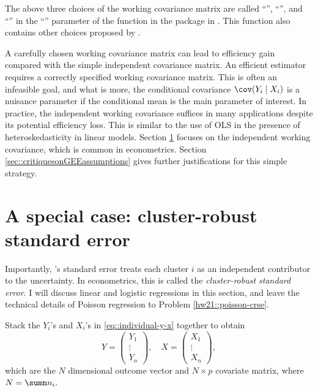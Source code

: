 The above three choices of the working covariance matrix are called
``'', ``'', and ``'' in the ``''
parameter of the function  in the  package in . This function
also contains other choices proposed by \citet{liang1986longitudinal}. 


A carefully chosen working covariance matrix can lead to efficiency gain compared with the simple independent covariance matrix. An efficient estimator requires a correctly specified working covariance matrix. This is often an infeasible goal, and what is more, the conditional covariance $\cov(Y_i\mid X_i)$ is a nuisance parameter if the conditional mean is the main parameter of interest. In practice, the independent working covariance suffices in many applications despite its potential efficiency loss. This is similar to the use of OLS in the presence of heteroskedasticity in linear models. Section \ref{sec::crse-econometrics} focuses on the independent working covariance, which is common in econometrics. Section \ref{sec::critiquesonGEEassumptions} gives further justifications for this simple strategy. 



\section{A special case: cluster-robust standard error} 
\label{sec::crse-econometrics}


Importantly, \citet{liang1986longitudinal}'s standard error treats each cluster $i$ as an independent contributor to the uncertainty. In econometrics, this is called the {\it cluster-robust standard error}. 
I will discuss linear and logistic regressions in this section, and leave the technical details of Poisson regression to Problem \ref{hw21::poisson-crse}. 




Stack the $Y_i$'s and $X_i$'s in \eqref{eq::individual-y-x} together to obtain 
$$
Y = \begin{pmatrix}
Y_1 \\
\vdots \\
Y_n
\end{pmatrix},\quad
X = \begin{pmatrix}
X_1 \\
\vdots \\
X_n
\end{pmatrix},
$$
which are the $N$ dimensional outcome vector and $N\times p$ covariate matrix, where $N = \sumn n_i.$


